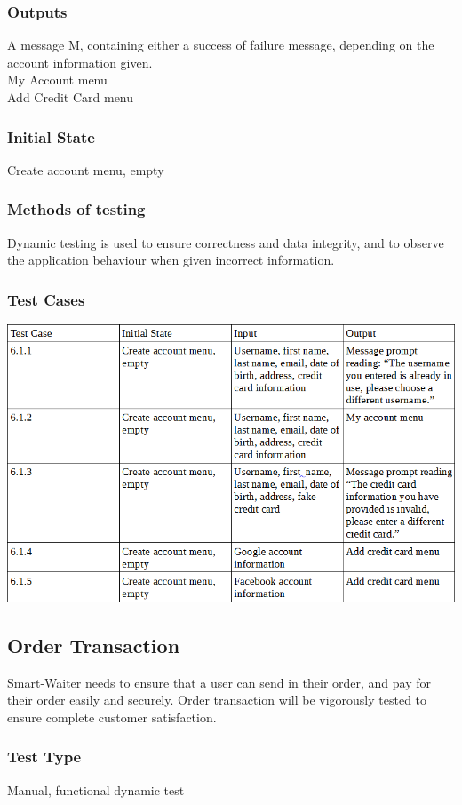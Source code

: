 \documentclass[12pt]{article}
\begin{document}
\subsubsection{Outputs}
A message M, containing either a success of failure message, depending on the account information given. \\
My Account menu \\
Add Credit Card menu \\
\subsubsection{Initial State}
Create account menu, empty
\subsubsection{Methods of testing}
Dynamic testing is used to ensure correctness and data integrity, and to observe the application behaviour when given incorrect information.
\subsubsection{Test Cases}
\includegraphics[width=\textwidth,height=\textheight,keepaspectratio]{accountTC.png}


\subsection{Order Transaction}
Smart-Waiter needs to ensure that a user can send in their order, and pay for their order easily and securely. Order transaction will be vigorously tested to ensure complete customer satisfaction.  
\subsubsection{Test Type}
Manual, functional dynamic test 
\end{document}
